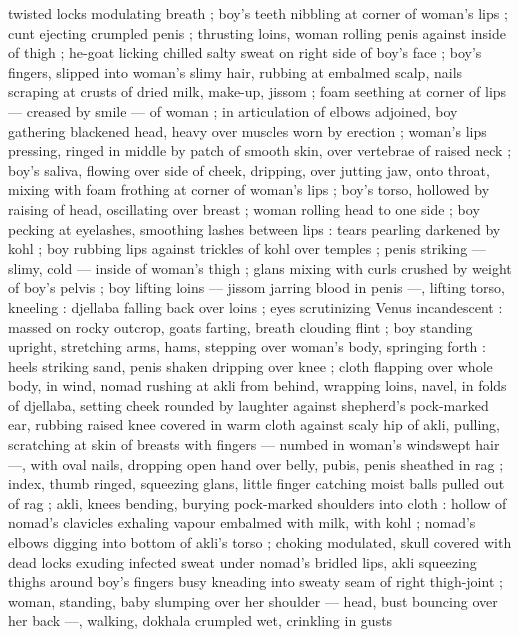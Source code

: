 twisted locks modulating breath ; boy's teeth nibbling at corner of 
woman's lips ; cunt ejecting crumpled penis ; thrusting loins, woman 
rolling penis against inside of thigh ; he-goat licking chilled salty 
sweat on right side of boy's face ; boy's fingers, slipped into 
woman's slimy hair, rubbing at embalmed scalp, nails scraping at 
crusts of dried milk, make-up, jissom ; foam seething at corner of 
lips --- creased by smile --- of woman ; in articulation of elbows 
adjoined, boy gathering blackened head, heavy over muscles worn 
by erection ; woman's lips pressing, ringed in middle by patch of 
smooth skin, over vertebrae of raised neck ; boy's saliva, flowing 
over side of cheek, dripping, over jutting jaw, onto throat, mixing with 
foam frothing at corner of woman's lips ; boy's torso, hollowed by 
raising of head, oscillating over breast ; woman rolling head to one 
side ; boy pecking at eyelashes, smoothing lashes between lips : 
tears pearling darkened by kohl ; boy rubbing lips against trickles of 
kohl over temples ; penis striking --- slimy, cold --- inside of 
woman's thigh ; glans mixing with curls crushed by weight of boy's 
pelvis ; boy lifting loins --- jissom jarring blood in penis ---, lifting 
torso, kneeling : djellaba falling back over loins ; eyes scrutinizing 
Venus incandescent : massed on rocky outcrop, goats farting, breath 
clouding flint ; boy standing upright, stretching arms, hams, stepping 
over woman's body, springing forth : heels striking sand, penis 
shaken dripping over knee ; cloth flapping over whole body, in wind, 
nomad rushing at akli from behind, wrapping loins, navel, in folds of 
djellaba, setting cheek rounded by laughter against shepherd's 
pock-marked ear, rubbing raised knee covered in warm cloth against 
scaly hip of akli, pulling, scratching at skin of breasts with fingers --- 
numbed in woman's windswept hair ---, with oval nails, dropping 
open hand over belly, pubis, penis sheathed in rag ; index, thumb 
ringed, squeezing glans, little finger catching moist balls pulled out 
of rag ; akli, knees bending, burying pock-marked shoulders into 
cloth : hollow of nomad's clavicles exhaling vapour embalmed with 
milk, with kohl ; nomad's elbows digging into bottom of akli's torso 
; choking modulated, skull covered with dead locks exuding infected 
sweat under nomad's bridled lips, akli squeezing thighs around boy's 
fingers busy kneading into sweaty seam of right thigh-joint ; woman, 
standing, baby slumping over her shoulder --- head, bust bouncing 
over her back ---, walking, dokhala crumpled wet, crinkling in gusts 
